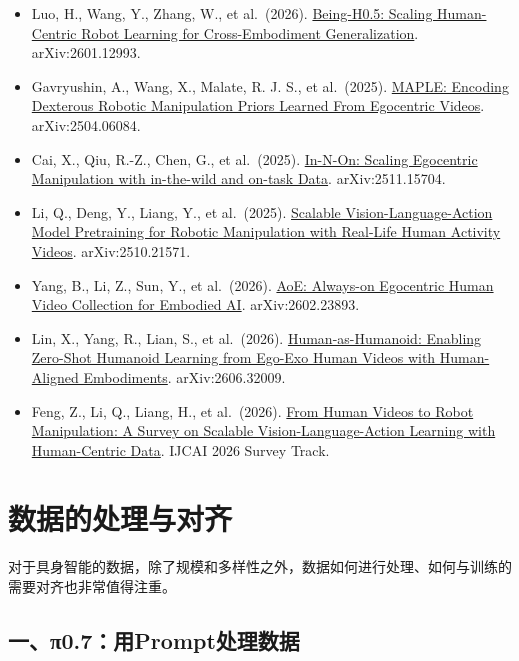 \begin{itemize}
\item
  Luo, H., Wang, Y., Zhang, W., et al.~(2026). \href{https://arxiv.org/abs/2601.12993}{Being-H0.5: Scaling Human-Centric Robot Learning for Cross-Embodiment Generalization}. arXiv:2601.12993.
\item
  Gavryushin, A., Wang, X., Malate, R. J. S., et al.~(2025). \href{https://arxiv.org/abs/2504.06084}{MAPLE: Encoding Dexterous Robotic Manipulation Priors Learned From Egocentric Videos}. arXiv:2504.06084.
\item
  Cai, X., Qiu, R.-Z., Chen, G., et al.~(2025). \href{https://arxiv.org/abs/2511.15704}{In-N-On: Scaling Egocentric Manipulation with in-the-wild and on-task Data}. arXiv:2511.15704.
\item
  Li, Q., Deng, Y., Liang, Y., et al.~(2025). \href{https://arxiv.org/abs/2510.21571}{Scalable Vision-Language-Action Model Pretraining for Robotic Manipulation with Real-Life Human Activity Videos}. arXiv:2510.21571.
\item
  Yang, B., Li, Z., Sun, Y., et al.~(2026). \href{https://arxiv.org/abs/2602.23893}{AoE: Always-on Egocentric Human Video Collection for Embodied AI}. arXiv:2602.23893.
\item
  Lin, X., Yang, R., Lian, S., et al.~(2026). \href{https://arxiv.org/abs/2606.32009}{Human-as-Humanoid: Enabling Zero-Shot Humanoid Learning from Ego-Exo Human Videos with Human-Aligned Embodiments}. arXiv:2606.32009.
\item
  Feng, Z., Li, Q., Liang, H., et al.~(2026). \href{https://arxiv.org/abs/2606.00054}{From Human Videos to Robot Manipulation: A Survey on Scalable Vision-Language-Action Learning with Human-Centric Data}. IJCAI 2026 Survey Track.
\end{itemize}

\clearpage

\hypertarget{ux6570ux636eux7684ux5904ux7406ux4e0eux5bf9ux9f50}{%
\section{数据的处理与对齐}\label{ux6570ux636eux7684ux5904ux7406ux4e0eux5bf9ux9f50}}

对于具身智能的数据，除了规模和多样性之外，数据如何进行处理、如何与训练的需要对齐也非常值得注重。

\hypertarget{ux4e00ux3c00.7ux7528promptux5904ux7406ux6570ux636e}{%
\subsection{一、π0.7：用Prompt处理数据}\label{ux4e00ux3c00.7ux7528promptux5904ux7406ux6570ux636e}}

